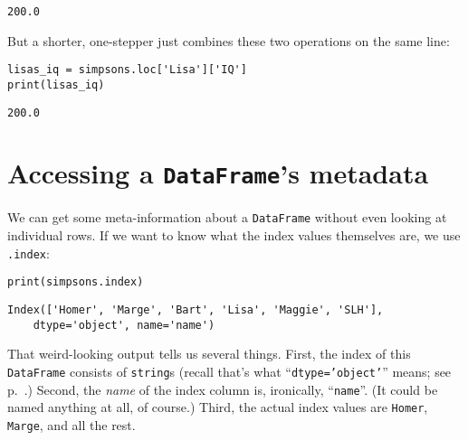 \begin{Verbatim}[fontsize=\small,samepage=true,frame=leftline,framesep=5mm,framerule=1mm]
200.0
\end{Verbatim}

But a shorter, one-stepper just combines these two operations on the same line:

\begin{Verbatim}[fontsize=\small,samepage=true,frame=single,framesep=3mm]
lisas_iq = simpsons.loc['Lisa']['IQ']
print(lisas_iq)
\end{Verbatim}
\vspace{-.2in}

\begin{Verbatim}[fontsize=\small,samepage=true,frame=leftline,framesep=5mm,framerule=1mm]
200.0
\end{Verbatim}

\section{Accessing a \texttt{DataFrame}'s metadata}


We can get some meta-information about a \texttt{DataFrame} without even
looking at individual rows. If we want to know what the index values themselves
are, we use \texttt{.index}:

\begin{Verbatim}[fontsize=\small,samepage=true,frame=single,framesep=3mm]
print(simpsons.index)
\end{Verbatim}
\vspace{-.2in}

\begin{Verbatim}[fontsize=\small,samepage=true,frame=leftline,framesep=5mm,framerule=1mm]
Index(['Homer', 'Marge', 'Bart', 'Lisa', 'Maggie', 'SLH'],
    dtype='object', name='name')
\end{Verbatim}

That weird-looking output tells us several things. First, the index of this
\texttt{DataFrame} consists of \texttt{string}s (recall that's what
``\texttt{dtype='object'}'' means; see p.~\pageref{dtypeRules}.) Second, the
\textit{name} of the index column is, ironically, ``\texttt{name}''. (It could
be named anything at all, of course.) Third, the actual index values are
\texttt{Homer}, \texttt{Marge}, and all the rest.


